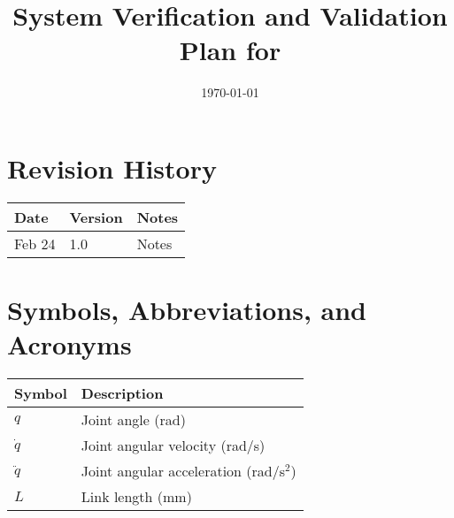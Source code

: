 \documentclass[12pt, titlepage]{article}
\begin{document}
\title{System Verification and Validation Plan for \progname{}} 
\author{\authname}
\date{\today}
	
\maketitle


\section*{Revision History}

\begin{tabularx}{\textwidth}{p{3cm}p{2cm}X}
\toprule {\bf Date} & {\bf Version} & {\bf Notes}\\
\midrule
Feb 24 & 1.0 & Notes\\
\bottomrule
\end{tabularx}



\newpage

\tableofcontents

\listoftables
{}

\listoffigures
{}

\newpage

\section{Symbols, Abbreviations, and Acronyms}

\renewcommand{\arraystretch}{1.2}
\begin{tabular}{l l} 
  \toprule		
  \textbf{Symbol} & \textbf{Description}\\
  \midrule 
  $q$ & Joint angle (rad) \\  
  $\dot{q}$ & Joint angular velocity (rad/s) \\  
  $\ddot{q}$ & Joint angular acceleration (rad/s$^2$) \\  
  $L$ & Link length (mm) \\  
  \bottomrule
\end{tabular}\\


\newpage

\end{document}
